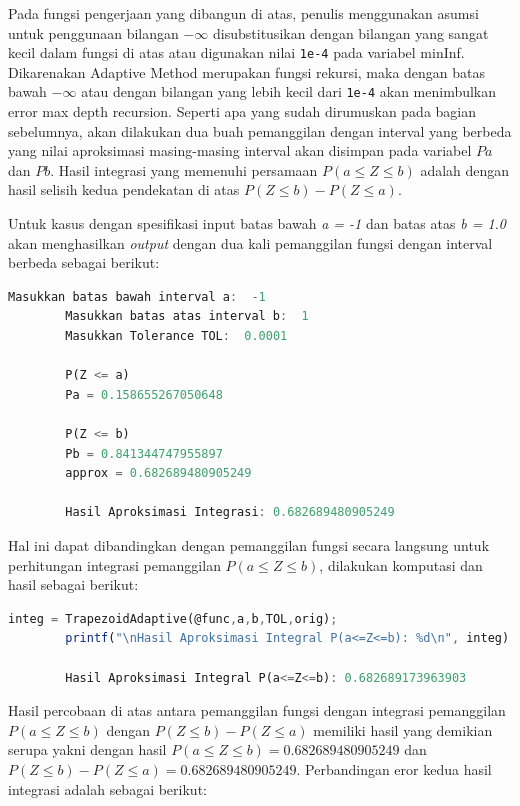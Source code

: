 \documentclass[journal,12pt,onecolumn,a4paper]{IEEEtran}
\begin{document}
Pada fungsi pengerjaan yang dibangun di atas, penulis menggunakan asumsi untuk penggunaan bilangan \(-\infty\) disubstitusikan dengan bilangan yang sangat kecil dalam fungsi di atas atau digunakan nilai \lstinline{1e-4} pada variabel minInf. Dikarenakan Adaptive Method merupakan fungsi rekursi, maka dengan batas bawah \(-\infty\) atau dengan bilangan yang lebih kecil dari \lstinline{1e-4} akan menimbulkan error max depth recursion.
Seperti apa yang sudah dirumuskan pada bagian sebelumnya, akan dilakukan dua buah pemanggilan dengan interval yang berbeda yang nilai aproksimasi masing-masing interval akan disimpan pada variabel \(Pa\) dan \(Pb\). Hasil integrasi yang memenuhi persamaan \(P(a \le Z \le b)\) adalah dengan hasil selisih kedua pendekatan di atas \(P(Z \le b ) - P(Z \le a )\).

Untuk kasus dengan spesifikasi input batas bawah \emph{a = -1} dan batas atas \emph{b = 1.0} akan menghasilkan \emph{output} dengan dua kali pemanggilan fungsi dengan interval berbeda sebagai berikut:

\begin{center}
	\begin{lstlisting}[language=Octave]
		Masukkan batas bawah interval a:  -1
		Masukkan batas atas interval b:  1
		Masukkan Tolerance TOL:  0.0001

		P(Z <= a)
		Pa = 0.158655267050648

		P(Z <= b)
		Pb = 0.841344747955897
		approx = 0.682689480905249

		Hasil Aproksimasi Integrasi: 0.682689480905249

	\end{lstlisting}
\end{center}

Hal ini dapat dibandingkan dengan pemanggilan fungsi secara langsung untuk perhitungan integrasi pemanggilan \(P(a \le Z \le b)\), dilakukan komputasi dan hasil sebagai berikut:
\begin{center}
	\begin{lstlisting}[language=Octave]
		integ = TrapezoidAdaptive(@func,a,b,TOL,orig);
		printf("\nHasil Aproksimasi Integral P(a<=Z<=b): %d\n", integ)

		Hasil Aproksimasi Integral P(a<=Z<=b): 0.682689173963903
	\end{lstlisting}
\end{center}

Hasil percobaan di atas antara pemanggilan fungsi dengan integrasi pemanggilan \(P(a \le Z \le b)\) dengan \(P(Z \le b ) - P(Z \le a )\) memiliki hasil yang demikian serupa yakni dengan hasil \(P(a \le Z \le b)= 0.682689480905249\)  dan \(P(Z \le b ) - P(Z \le a ) = 0.682689480905249\). Perbandingan eror kedua hasil integrasi adalah sebagai berikut:
\end{document}
